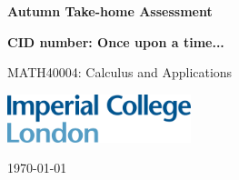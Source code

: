 \documentclass[10pt, a4paper]{article}
\begin{document}
\begin{titlepage}
    \begin{center}
        \vspace*{3cm}
            
        \Huge
        \textbf{
            Autumn Take-home Assessment
                }
            
            
        \vspace{1.5cm}
        \Large
            
        \textbf{
        CID number: Once upon a time...}%
        
            
        \vfill
        
        MATH40004: Calculus and Applications        
        \vspace{1cm}
            
        \includegraphics[width=0.4\textwidth]{icl_logo.png}
        \\
        
        \Large
        
        \today
            
    \end{center}
\end{titlepage}
\end{document}
